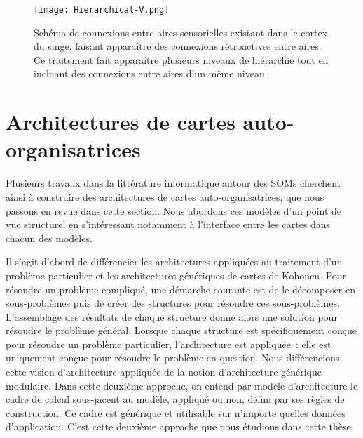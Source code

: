 \documentclass[../main]{subfiles}
\begin{document}

\begin{figure}
    \centering
    \texttt{[image: Hierarchical-V.png]}
    \caption{Schéma de connexions entre aires sensorielles existant dans le cortex du singe, faisant apparaître des connexions rétroactives entre aires. Ce traitement fait apparaître plusieurs niveaux de hiérarchie tout en incluant des connexions entre aires d'un même niveau \cite{primate_cortex_91}\label{fig:primate}}
\end{figure}

\section{Architectures de cartes auto-organisatrices}

Plusieurs travaux dans la littérature informatique autour des SOMs cherchent ainsi à construire des architectures de cartes auto-organisatrices, que nous passons en revue dans cette section.
Nous abordons ces modèles d'un point de vue structurel en s'intéressant notamment à l'interface entre les cartes dans chacun des modèles.

Il s'agit d'abord de différencier les architectures appliquées au traitement d'un problème particulier et les architectures génériques de cartes de Kohonen.
Pour résoudre un problème compliqué, une démarche courante est de le décomposer en sous-problèmes puis de créer des structures pour résoudre ces sous-problèmes. L'assemblage des résultats de chaque structure donne alors une solution pour résoudre le problème général.
Lorsque chaque structure est spécifiquement conçue pour résoudre un problème particulier, l'architecture est appliquée~: elle est uniquement conçue pour résoudre le problème en question.
Nous différencions cette vision d'architecture appliquée de la notion d'architecture générique modulaire.
Dans cette deuxième approche, on entend par modèle d'architecture le cadre de calcul sous-jacent au modèle, appliqué ou non, défini par ses règles de construction. Ce cadre est générique et utilisable sur n'importe quelles données d'application. 
C'est cette deuxième approche que nous étudions dans cette thèse.
\end{document}
